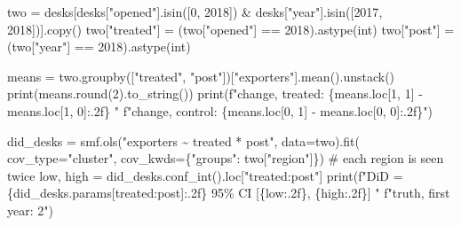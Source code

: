\documentclass[
  letterpaper,
  10pt,
  twoside,
  openright,
  numbers=noenddot,
  chapterprefix=true]{scrbook}
\newenvironment{Shaded}{}{}
\newcommand{\BuiltInTok}[1]{\textcolor[rgb]{0.84,0.23,0.29}{#1}}
\newcommand{\CommentTok}[1]{\textcolor[rgb]{0.42,0.45,0.49}{#1}}
\newcommand{\DecValTok}[1]{\textcolor[rgb]{0.00,0.36,0.77}{#1}}
\newcommand{\NormalTok}[1]{\textcolor[rgb]{0.14,0.16,0.18}{#1}}
\newcommand{\OperatorTok}[1]{\textcolor[rgb]{0.14,0.16,0.18}{#1}}
\newcommand{\SpecialCharTok}[1]{\textcolor[rgb]{0.00,0.36,0.77}{#1}}
\newcommand{\SpecialStringTok}[1]{\textcolor[rgb]{0.01,0.18,0.38}{#1}}
\newcommand{\StringTok}[1]{\textcolor[rgb]{0.01,0.18,0.38}{#1}}
\begin{document}
\label{check-desks-2x2}
\begin{Shaded}
\begin{Highlighting}[]
\NormalTok{two }\OperatorTok{=}\NormalTok{ desks[desks[}\StringTok{"opened"}\NormalTok{].isin([}\DecValTok{0}\NormalTok{, }\DecValTok{2018}\NormalTok{]) }\OperatorTok{\&}\NormalTok{ desks[}\StringTok{"year"}\NormalTok{].isin([}\DecValTok{2017}\NormalTok{, }\DecValTok{2018}\NormalTok{])].copy()}
\NormalTok{two[}\StringTok{"treated"}\NormalTok{] }\OperatorTok{=}\NormalTok{ (two[}\StringTok{"opened"}\NormalTok{] }\OperatorTok{==} \DecValTok{2018}\NormalTok{).astype(}\BuiltInTok{int}\NormalTok{)}
\NormalTok{two[}\StringTok{"post"}\NormalTok{] }\OperatorTok{=}\NormalTok{ (two[}\StringTok{"year"}\NormalTok{] }\OperatorTok{==} \DecValTok{2018}\NormalTok{).astype(}\BuiltInTok{int}\NormalTok{)}

\NormalTok{means }\OperatorTok{=}\NormalTok{ two.groupby([}\StringTok{"treated"}\NormalTok{, }\StringTok{"post"}\NormalTok{])[}\StringTok{"exporters"}\NormalTok{].mean().unstack()}
\BuiltInTok{print}\NormalTok{(means.}\BuiltInTok{round}\NormalTok{(}\DecValTok{2}\NormalTok{).to\_string())}
\BuiltInTok{print}\NormalTok{(}\SpecialStringTok{f"change, treated: }\SpecialCharTok{\{}\NormalTok{means}\SpecialCharTok{.}\NormalTok{loc[}\DecValTok{1}\NormalTok{, }\DecValTok{1}\NormalTok{] }\OperatorTok{{-}}\NormalTok{ means}\SpecialCharTok{.}\NormalTok{loc[}\DecValTok{1}\NormalTok{, }\DecValTok{0}\NormalTok{]}\SpecialCharTok{:.2f\}}\SpecialStringTok{   "}
      \SpecialStringTok{f"change, control: }\SpecialCharTok{\{}\NormalTok{means}\SpecialCharTok{.}\NormalTok{loc[}\DecValTok{0}\NormalTok{, }\DecValTok{1}\NormalTok{] }\OperatorTok{{-}}\NormalTok{ means}\SpecialCharTok{.}\NormalTok{loc[}\DecValTok{0}\NormalTok{, }\DecValTok{0}\NormalTok{]}\SpecialCharTok{:.2f\}}\SpecialStringTok{"}\NormalTok{)}

\NormalTok{did\_desks }\OperatorTok{=}\NormalTok{ smf.ols(}\StringTok{"exporters \textasciitilde{} treated * post"}\NormalTok{, data}\OperatorTok{=}\NormalTok{two).fit(}
\NormalTok{    cov\_type}\OperatorTok{=}\StringTok{"cluster"}\NormalTok{, cov\_kwds}\OperatorTok{=}\NormalTok{\{}\StringTok{"groups"}\NormalTok{: two[}\StringTok{"region"}\NormalTok{]\})      }\CommentTok{\# each region is seen twice}
\NormalTok{low, high }\OperatorTok{=}\NormalTok{ did\_desks.conf\_int().loc[}\StringTok{"treated:post"}\NormalTok{]}
\BuiltInTok{print}\NormalTok{(}\SpecialStringTok{f"DiD = }\SpecialCharTok{\{}\NormalTok{did\_desks}\SpecialCharTok{.}\NormalTok{params[}\StringTok{\textquotesingle{}treated:post\textquotesingle{}}\NormalTok{]}\SpecialCharTok{:.2f\}}\SpecialStringTok{   95\% CI [}\SpecialCharTok{\{}\NormalTok{low}\SpecialCharTok{:.2f\}}\SpecialStringTok{, }\SpecialCharTok{\{}\NormalTok{high}\SpecialCharTok{:.2f\}}\SpecialStringTok{]   "}
      \SpecialStringTok{f"truth, first year: 2"}\NormalTok{)}
\end{Highlighting}
\end{Shaded}
\end{document}
